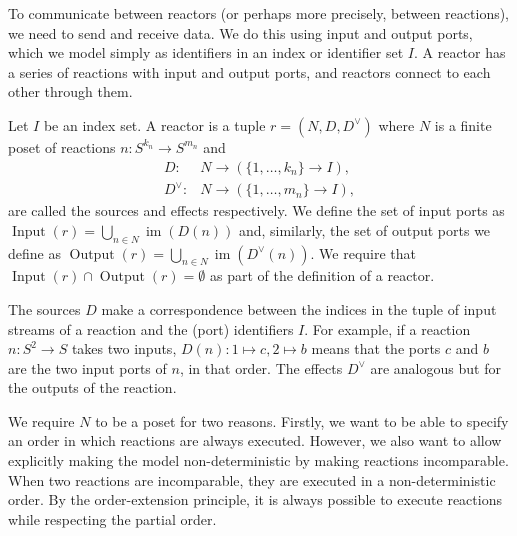 To communicate between reactors (or perhaps more precisely, between reactions), we need to send and receive data.
We do this using input and output ports, which we model simply as identifiers in an index or identifier set $I$. 
A reactor has a series of reactions with input and output ports, and reactors connect to each other through them.

\begin{defn}[Reactor]
\label{defn:reactor}
Let $I$ be an index set. A reactor is a tuple $r = (N,D,D^\vee)$  where $N$ is a finite \ac{poset} of reactions $n : S^{k_n} \rightarrow S^{m_n}$ and
 \begin{align*} D : & N \rightarrow (\{1, \ldots, k_n\} \rightarrow I), \\
     D^\vee : & N \rightarrow (\{1, \ldots, m_n\} \rightarrow I),
 \end{align*} are called the sources and effects respectively.
We define the set of input ports as $\operatorname{Input}(r) = \bigcup_{ n \in N} \operatorname{im}(D(n))$  and, 
similarly, the set of output ports we define as $\operatorname{Output}(r) = \bigcup_{ n \in N} \operatorname{im}(D^\vee(n)).$
We require that $\operatorname{Input}(r) \cap \operatorname{Output}(r) = \emptyset$ as part of the definition of a reactor.
\end{defn}

The sources $D$ make a correspondence between the indices in the tuple of input streams of a reaction and the (port) identifiers $I$.
For example, if a reaction $n : S^2 \rightarrow S$ takes two inputs, $D(n) : 1 \mapsto c, 2 \mapsto b$ means that the ports $c$ and $b$ are the two input ports of $n$, in that order.
The effects $D^\vee$ are analogous but for the outputs of the reaction.

We require $N$ to be a \ac{poset} for two reasons.
Firstly, we want to be able to specify an order in which reactions are always executed.
However, we also want to allow explicitly making the model non-deterministic by making reactions incomparable. 
When two reactions are incomparable, they are executed in a non-deterministic order.
By the order-extension principle, it is always possible to execute reactions while respecting the partial order.

